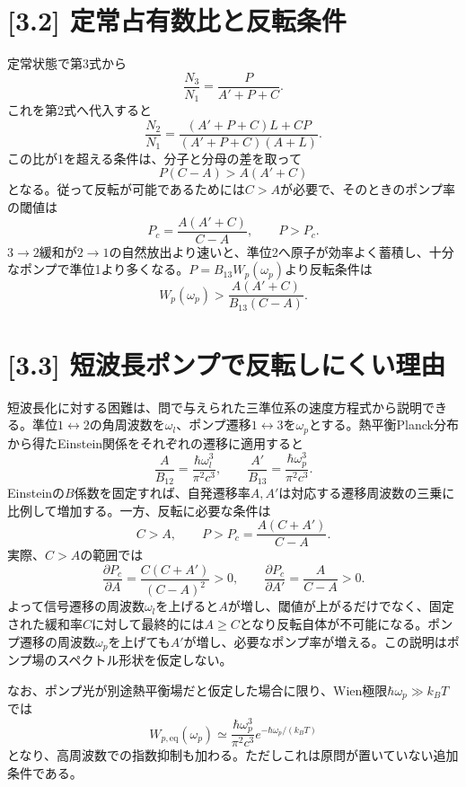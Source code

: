 \documentclass[11pt,a4paper]{article}
\begin{document}
\section*{[3.2] 定常占有数比と反転条件}
定常状態で第3式から
\begin{equation}
 \frac{N_3}{N_1}=\frac{P}{A'+P+C}.
\end{equation}
これを第2式へ代入すると
\begin{equation}
 \boxed{\frac{N_2}{N_1}=
 \frac{(A'+P+C)L+CP}{(A'+P+C)(A+L)}}.
\end{equation}
この比が1を超える条件は、分子と分母の差を取って
\begin{equation}
 P(C-A)>A(A'+C)
\end{equation}
となる。従って反転が可能であるためには$C>A$が必要で、そのときのポンプ率の閾値は
\begin{equation}
 \boxed{P_c=\frac{A(A'+C)}{C-A}},\qquad P>P_c.
\end{equation}
$3\to2$緩和が$2\to1$の自然放出より速いと、準位2へ原子が効率よく蓄積し、十分なポンプで準位1より多くなる。$P=B_{13}W_p(\omega_p)$より反転条件は
\begin{equation}
 W_p(\omega_p)>\frac{A(A'+C)}{B_{13}(C-A)}.
\end{equation}

\section*{[3.3] 短波長ポンプで反転しにくい理由}
短波長化に対する困難は、問で与えられた三準位系の速度方程式から説明できる。準位$1\leftrightarrow2$の角周波数を$\omega_l$、ポンプ遷移$1\leftrightarrow3$を$\omega_p$とする。熱平衡Planck分布から得たEinstein関係をそれぞれの遷移に適用すると
\begin{equation}
 \frac{A}{B_{12}}=\frac{\hbar\omega_l^3}{\pi^2c^3},\qquad
 \frac{A'}{B_{13}}=\frac{\hbar\omega_p^3}{\pi^2c^3}.
\end{equation}
Einsteinの$B$係数を固定すれば、自発遷移率$A,A'$は対応する遷移周波数の三乗に比例して増加する。一方、反転に必要な条件は
\begin{equation}
 C>A,\qquad P>P_c=\frac{A(C+A')}{C-A}.
\end{equation}
実際、$C>A$の範囲では
\begin{equation}
 \frac{\partial P_c}{\partial A}=\frac{C(C+A')}{(C-A)^2}>0,\qquad
 \frac{\partial P_c}{\partial A'}=\frac{A}{C-A}>0.
\end{equation}
よって信号遷移の周波数$\omega_l$を上げると$A$が増し、閾値が上がるだけでなく、固定された緩和率$C$に対して最終的には$A\ge C$となり反転自体が不可能になる。ポンプ遷移の周波数$\omega_p$を上げても$A'$が増し、必要なポンプ率が増える。この説明はポンプ場のスペクトル形状を仮定しない。

なお、ポンプ光が別途熱平衡場だと仮定した場合に限り、Wien極限$\hbar\omega_p\gg k_BT$では
\begin{equation}
 W_{p,\mathrm{eq}}(\omega_p)\simeq\frac{\hbar\omega_p^3}{\pi^2c^3}
 e^{-\hbar\omega_p/(k_BT)}
\end{equation}
となり、高周波数での指数抑制も加わる。ただしこれは原問が置いていない追加条件である。
\end{document}
